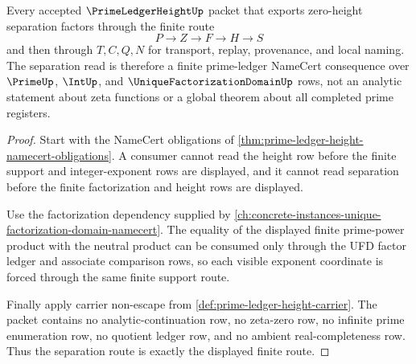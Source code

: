 \begin{theorem}
\label{thm:prime-ledger-height-separation-route}
Every accepted $\PrimeLedgerHeightUp$ packet that exports zero-height separation factors through the finite route
$$
P \longrightarrow Z \longrightarrow F \longrightarrow H \longrightarrow S
$$
and then through $T,C,Q,N$ for transport, replay, provenance, and local naming. The separation read is therefore a finite prime-ledger NameCert consequence over $\PrimeUp$, $\IntUp$, and $\UniqueFactorizationDomainUp$ rows, not an analytic statement about zeta functions or a global theorem about all completed prime registers.
\end{theorem}
\begin{proof}
Start with the NameCert obligations of \autoref{thm:prime-ledger-height-namecert-obligations}. A consumer cannot read the height row before the finite support and integer-exponent rows are displayed, and it cannot read separation before the finite factorization and height rows are displayed.

Use the factorization dependency supplied by \autoref{ch:concrete-instances-unique-factorization-domain-namecert}. The equality of the displayed finite prime-power product with the neutral product can be consumed only through the UFD factor ledger and associate comparison rows, so each visible exponent coordinate is forced through the same finite support route.

Finally apply carrier non-escape from \autoref{def:prime-ledger-height-carrier}. The packet contains no analytic-continuation row, no zeta-zero row, no infinite prime enumeration row, no quotient ledger row, and no ambient real-completeness row. Thus the separation route is exactly the displayed finite route.
\end{proof}


